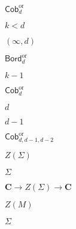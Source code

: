 \begin{preview}
\setcounter{equation}{0}%
\( \mathsf{Cob}_d^{\mathrm{or}} \)
\end{preview}

\begin{preview}
\setcounter{equation}{0}%
\( k < d \)
\end{preview}

\begin{preview}
\setcounter{equation}{0}%
\( (\infty,d) \)
\end{preview}

\begin{preview}
\setcounter{equation}{0}%
\( \mathsf{Bord}_d^{\mathrm{or}} \)
\end{preview}

\begin{preview}
\setcounter{equation}{0}%
\( k-1 \)
\end{preview}

\begin{preview}
\setcounter{equation}{0}%
\( \mathsf{Cob}_d^{\mathrm{or}} \)
\end{preview}

\begin{preview}
\setcounter{equation}{0}%
\( d \)
\end{preview}

\begin{preview}
\setcounter{equation}{0}%
\( d-1 \)
\end{preview}

\begin{preview}
\setcounter{equation}{0}%
\(\mathsf{Cob}_{d,d-1,d-2}^{\mathrm{or}}\)
\end{preview}

\begin{preview}
\setcounter{equation}{0}%
\( Z(\Sigma) \)
\end{preview}

\begin{preview}
\setcounter{equation}{0}%
\( \Sigma \)
\end{preview}

\begin{preview}
\setcounter{equation}{0}%
\( \mathbf{C} \to Z( \Sigma) \to \mathbf{C} \)
\end{preview}

\begin{preview}
\setcounter{equation}{0}%
\( Z(M) \)
\end{preview}

\begin{preview}
\setcounter{equation}{0}%
\( \Sigma \)
\end{preview}

